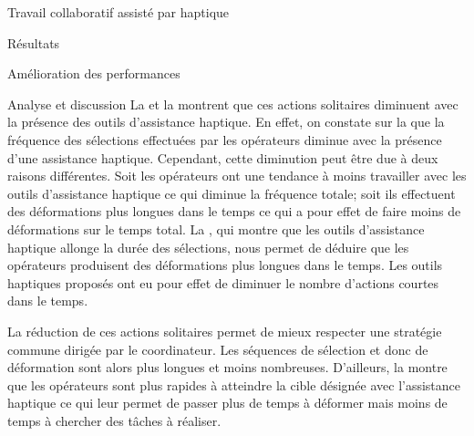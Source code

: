 \documentclass[myfrancais,ngerman,english,frenchb]{mythesis}
\begin{document}
\begin{mychapter}{Travail collaboratif assisté par haptique}
\begin{mysection}{Résultats}
\begin{mysubsection}{Amélioration des performances}
\begin{mysubsubsection}{Analyse et discussion}
					La  et la  montrent que ces actions solitaires diminuent avec la présence des outils d'assistance haptique.
					En effet, on constate sur la  que la fréquence des sélections effectuées par les opérateurs diminue avec la présence d'une assistance haptique.
					Cependant, cette diminution peut être due à deux raisons différentes.
					Soit les opérateurs ont une tendance à moins travailler avec les outils d'assistance haptique ce qui diminue la fréquence totale; soit ils effectuent des déformations plus longues dans le temps ce qui a pour effet de faire moins de déformations sur le temps total.
					La , qui montre que les outils d'assistance haptique allonge la durée des sélections, nous permet de déduire que les opérateurs produisent des déformations plus longues dans le temps.
					Les outils haptiques proposés ont eu pour effet de diminuer le nombre d'actions courtes dans le temps.

					La réduction de ces actions solitaires permet de mieux respecter une stratégie commune dirigée par le coordinateur.
					Les séquences de sélection et donc de déformation sont alors plus longues et moins nombreuses.
					D'ailleurs, la  montre que les opérateurs sont plus rapides à atteindre la cible désignée avec l'assistance haptique ce qui leur permet de passer plus de temps à déformer mais moins de temps à chercher des tâches à réaliser.


\end{mysubsubsection}
\end{mysubsection}
\end{mysection}
\end{mychapter}
\end{document}
